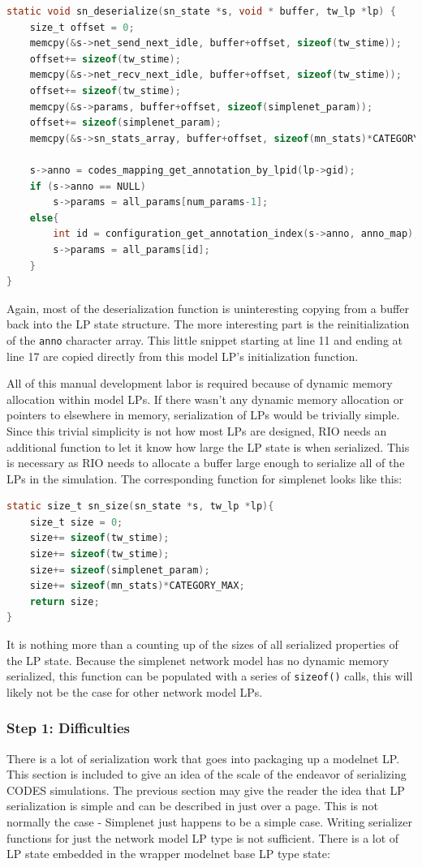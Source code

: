 \documentclass[letterpaper, 11 pt, conference]{IEEEtran}
\begin{document}
\begin{lstlisting}[language=C]
static void sn_deserialize(sn_state *s, void * buffer, tw_lp *lp) {
	size_t offset = 0;
	memcpy(&s->net_send_next_idle, buffer+offset, sizeof(tw_stime));
	offset+= sizeof(tw_stime);
	memcpy(&s->net_recv_next_idle, buffer+offset, sizeof(tw_stime));
	offset+= sizeof(tw_stime);
	memcpy(&s->params, buffer+offset, sizeof(simplenet_param));
	offset+= sizeof(simplenet_param);
	memcpy(&s->sn_stats_array, buffer+offset, sizeof(mn_stats)*CATEGORY_MAX);
	
	s->anno = codes_mapping_get_annotation_by_lpid(lp->gid);
	if (s->anno == NULL)
		s->params = all_params[num_params-1];
	else{
		int id = configuration_get_annotation_index(s->anno, anno_map);
		s->params = all_params[id];
	}
}
\end{lstlisting}

Again, most of the deserialization function is uninteresting copying from a buffer back into the LP state structure. The more interesting part is the reinitialization of the \texttt{anno} character array. This little snippet starting at line 11 and ending at line 17 are copied directly from this model LP's initialization function.

All of this manual development labor is required because of dynamic memory allocation within model LPs. If there wasn't any dynamic memory allocation or pointers to elsewhere in memory, serialization of LPs would be trivially simple. Since this trivial simplicity is not how most LPs are designed, RIO needs an additional function to let it know how large the LP state is when serialized. This is necessary as RIO needs to allocate a buffer large enough to serialize all of the LPs in the simulation. The corresponding function for simplenet looks like this:

\begin{lstlisting}[language=C]
static size_t sn_size(sn_state *s, tw_lp *lp){
	size_t size = 0;
	size+= sizeof(tw_stime);
	size+= sizeof(tw_stime);
	size+= sizeof(simplenet_param);
	size+= sizeof(mn_stats)*CATEGORY_MAX;
	return size;
}
\end{lstlisting}

It is nothing more than a counting up of the sizes of all serialized properties of the LP state. Because the simplenet network model has no dynamic memory serialized, this function can be populated with a series of \texttt{sizeof()} calls, this will likely not be the case for other network model LPs.


\subsubsection{Step 1: Difficulties}
There is a lot of serialization work that goes into packaging up a modelnet LP. This section is included to give an idea of the scale of the endeavor of serializing CODES simulations. The previous section may give the reader the idea that LP serialization is simple and can be described in just over a page. This is not normally the case - Simplenet just happens to be a simple case. Writing serializer functions for just the network model LP type is not sufficient. There is a lot of LP state embedded in the wrapper modelnet base LP type state:
\end{document}
